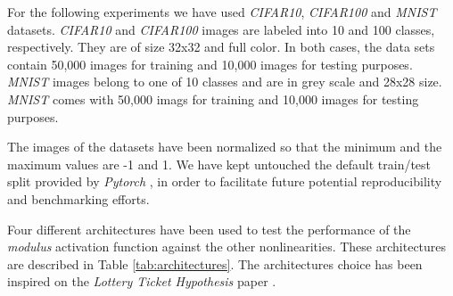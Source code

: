 For the following experiments we have used \textit{CIFAR10}, \textit{CIFAR100} \cite{krizhevsky09} and \textit{MNIST} \cite{lecun2010} datasets. \textit{CIFAR10} and \textit{CIFAR100} images are labeled into 10 and 100 classes, respectively. They are of size 32x32 and full color. In both cases, the data sets contain 50,000 images for training and 10,000 images for testing purposes. \textit{MNIST} images belong to one of 10 classes and are in grey scale and 28x28 size. \textit{MNIST} comes with 50,000 imags for training and 10,000 images for testing purposes.

The images of the datasets have been normalized so that the minimum and the maximum values are -1 and 1. We have kept untouched the default train/test split provided by \textit{Pytorch} \cite{Paszke2019}, in order to facilitate future potential reproducibility and benchmarking efforts.

Four different architectures have been used to test the performance of the \textit{modulus} activation function against the other nonlinearities. These architectures are described in Table \ref{tab:architectures}. The architectures choice has been inspired on the \textit{Lottery Ticket Hypothesis} paper \cite{frankleC19}.





